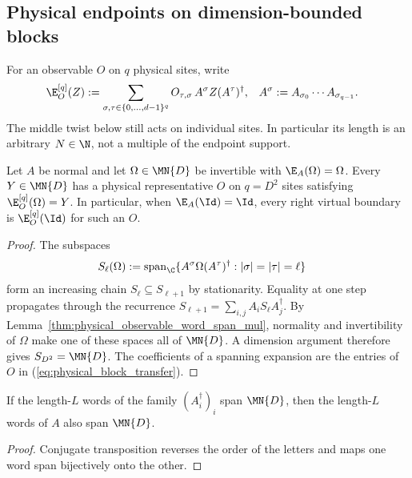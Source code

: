 \subsection{Physical endpoints on dimension-bounded blocks}

For an observable $O$ on $q$ physical sites, write
\begin{align}
    \E_O^{[q]}(Z)
     & :=\sum_{\sigma,\tau\in\{0,\ldots,d-1\}^q}
    O_{\tau,\sigma}\,A^\sigma Z(A^\tau)^\dagger,
     & A^\sigma                                  & :=A_{\sigma_0}\cdots A_{\sigma_{q-1}}.
    \label{eq:physical_block_transfer}
\end{align}
The middle twist below still acts on individual sites. In particular its
length is an arbitrary $N\in\N$, not a multiple of the endpoint support.

\begin{lemma}
    \label{thm:physical_endpoint_stationary_span}
    \leanok
    Let $A$ be normal and let $\Omega\in\MN{D}$ be invertible with
    $\E_A(\Omega)=\Omega$. Every $Y\in\MN{D}$ has a physical representative
    $O$ on $q=D^2$ sites satisfying $\E_O^{[q]}(\Omega)=Y$.
    In particular, when $\E_A(\Id)=\Id$, every right virtual boundary is
    $\E_O^{[q]}(\Id)$ for such an $O$.
\end{lemma}
\begin{proof}
    \leanok
    The subspaces
    \begin{align}
        S_\ell(\Omega)
         & :=\operatorname{span}_{\C}
        \{A^\sigma\Omega(A^\tau)^\dagger:|\sigma|=|\tau|=\ell\}
        \notag
    \end{align}
    form an increasing chain $S_\ell\subseteq S_{\ell+1}$ by stationarity. Equality at one step
    propagates through the recurrence
    $S_{\ell+1}=\sum_{i,j}A_iS_\ell A_j^\dagger$.
    By Lemma~\ref{thm:physical_observable_word_span_mul}, normality and
    invertibility of $\Omega$ make one of these spaces all of $\MN{D}$. A dimension argument therefore gives $S_{D^2}=\MN{D}$.
    The coefficients of a spanning expansion are the entries of $O$ in
    (\ref{eq:physical_block_transfer}).
\end{proof}

\begin{lemma}
    \label{thm:block_injectivity_adjoint_reverse}
    \leanok
    If the length-$L$ words of the family $(A_i^\dagger)_i$ span $\MN{D}$,
    then the length-$L$ words of $A$ also span $\MN{D}$.
\end{lemma}
\begin{proof}
    \leanok
    Conjugate transposition reverses the order of the letters and maps one
    word span bijectively onto the other.
\end{proof}

